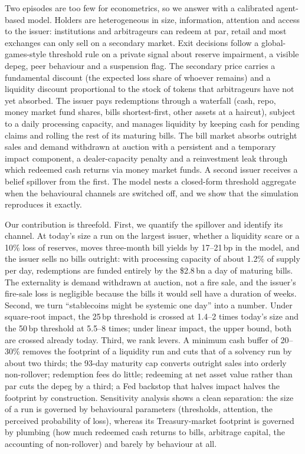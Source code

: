 Two episodes are too few for econometrics, so we answer with a calibrated agent-based model. Holders are
heterogeneous in size, information, attention and access to the issuer: institutions and arbitrageurs can redeem
at par, retail and most exchanges can only sell on a secondary market. Exit decisions follow a global-games-style
threshold rule on a private signal about reserve impairment, a visible depeg, peer behaviour and a suspension
flag. The secondary price carries a fundamental discount (the expected loss share of whoever remains) and a
liquidity discount proportional to the stock of tokens that arbitrageurs have not yet absorbed. The issuer pays
redemptions through a waterfall (cash, repo, money market fund shares, bills shortest-first, other assets at a
haircut), subject to a daily processing capacity, and manages liquidity by keeping cash for pending claims and
rolling the rest of its maturing bills. The bill market absorbs outright sales and demand withdrawn at auction
with a persistent and a temporary impact component, a dealer-capacity penalty and a reinvestment leak through
which redeemed cash returns via money market funds. A second issuer receives a belief spillover from the first.
The model nests a closed-form threshold aggregate when the behavioural channels are switched off, and we show
that the simulation reproduces it exactly.

Our contribution is threefold. First, we quantify the spillover and identify its channel. At today's size a run on
the largest issuer, whether a liquidity scare or a 10\% loss of reserves, moves three-month bill yields by
17--21\,bp in the model, and the issuer sells no bills outright: with processing capacity of about 1.2\% of
supply per day, redemptions are funded entirely by the \$2.8\,bn a day of maturing bills. The externality is
demand withdrawn at auction, not a fire sale, and the issuer's fire-sale loss is negligible because the bills it
would sell have a duration of weeks. Second, we turn ``stablecoins might be systemic one day'' into a number. Under
square-root impact, the 25\,bp threshold is crossed at 1.4--2 times today's size and the 50\,bp threshold at
5.5--8 times; under linear impact, the upper bound, both are crossed already today. Third, we rank levers. A
minimum cash buffer of 20--30\% removes the footprint of a liquidity run and cuts that of a solvency run by about
two thirds; the 93-day maturity cap converts outright sales into orderly non-rollover; redemption fees do
little; redeeming at net asset value rather than par cuts the depeg by a third; a Fed backstop that halves impact halves
the footprint by construction. Sensitivity analysis shows a clean separation: the size of a run is governed by
behavioural parameters (thresholds, attention, the perceived probability of loss), whereas its Treasury-market
footprint is governed by plumbing (how much redeemed cash returns to bills, arbitrage capital, the accounting of
non-rollover) and barely by behaviour at all.

